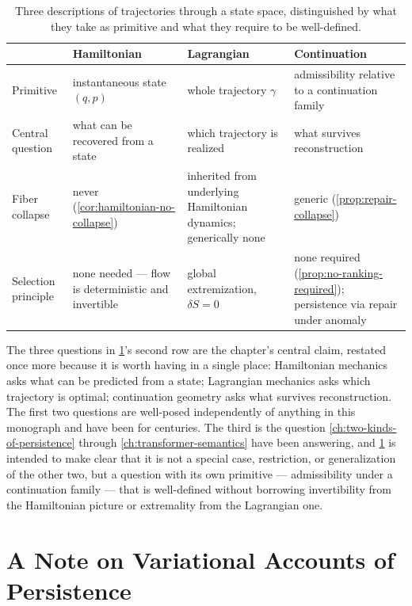 \documentclass[11pt]{book}
\theoremstyle{plain}
\theoremstyle{definition}
\theoremstyle{remark}
\begin{document}
\begin{table}[htbp]
\centering
\footnotesize
\setlength{\tabcolsep}{4pt}
\begin{tabular}{p{2.2cm}p{3.0cm}p{3.0cm}p{3.0cm}}
\toprule
& \textbf{Hamiltonian} & \textbf{Lagrangian} & \textbf{Continuation} \\
\midrule
Primitive & instantaneous state $(q,p)$ & whole trajectory $\gamma$ & admissibility relative to a continuation family \\
Central question & what can be recovered from a state & which trajectory is realized & what survives reconstruction \\
Fiber collapse & never (\cref{cor:hamiltonian-no-collapse}) & inherited from underlying Hamiltonian dynamics; generically none & generic (\cref{prop:repair-collapse}) \\
Selection principle & none needed --- flow is deterministic and invertible & global extremization, $\delta S = 0$ & none required (\cref{prop:no-ranking-required}); persistence via repair under anomaly \\
\bottomrule
\end{tabular}
\caption{Three descriptions of trajectories through a state space, distinguished by what they take as primitive and what they require to be well-defined.}
\label{tab:three-regimes}
\end{table}

The three questions in \cref{tab:three-regimes}'s second row are the
chapter's central claim, restated once more because it is worth
having in a single place: Hamiltonian mechanics asks what can be
predicted from a state; Lagrangian mechanics asks which trajectory is
optimal; continuation geometry asks what survives reconstruction. The
first two questions are well-posed independently of anything in this
monograph and have been for centuries. The third is the question
\cref{ch:two-kinds-of-persistence} through \cref{ch:transformer-semantics}
have been answering, and \cref{tab:three-regimes} is intended to make
clear that it is not a special case, restriction, or generalization of
the other two, but a question with its own primitive --- admissibility
under a continuation family --- that is well-defined without borrowing
invertibility from the Hamiltonian picture or extremality from the
Lagrangian one.

\section{A Note on Variational Accounts of Persistence}
\end{document}
